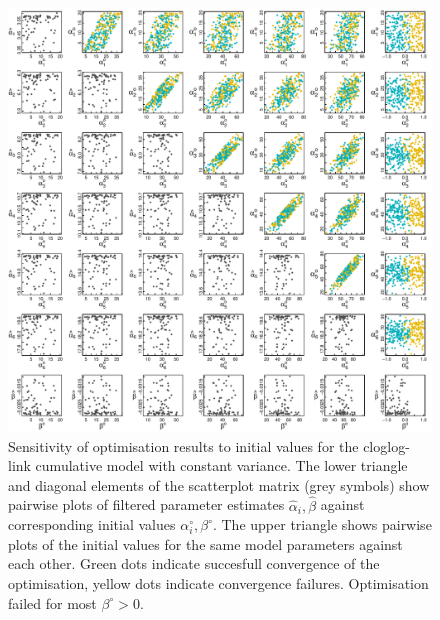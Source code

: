 \begin{figure}[p]
  \centering
  \includegraphics[width=\textwidth]{../figures/figS3_initial_value_sensitivity_cloglog.pdf}
  \caption{Sensitivity of optimisation results to initial values for the cloglog-link cumulative model with constant variance. The lower triangle and diagonal elements of the scatterplot matrix (grey symbols) show pairwise plots of filtered parameter estimates $\hat{\alpha}_i, \hat{\beta}$ against corresponding initial values $\alpha^{\circ}_i, \beta^{\circ}$. The upper triangle shows pairwise plots of the initial values for the same model parameters against each other. Green dots indicate succesfull convergence of the optimisation, yellow dots indicate convergence failures. Optimisation failed for most $\beta^{\circ}>0$.}
  \label{fig:fig5}
\end{figure} 